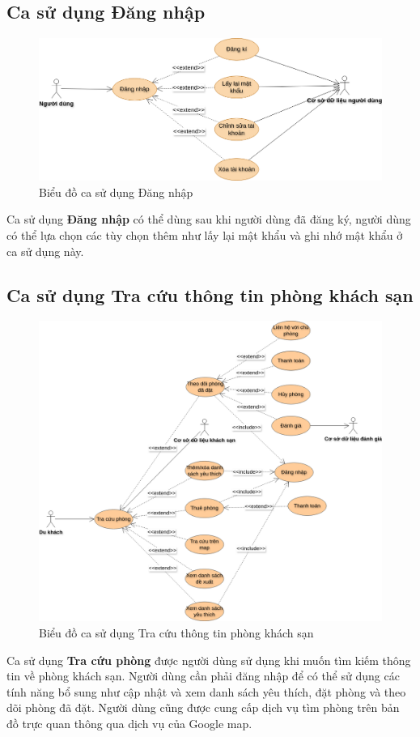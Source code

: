 \subsection{Ca sử dụng Đăng nhập}
\begin{figure}[H]
    \centering
    \includegraphics[width=\textwidth]{img/Use_Case-Đăng nhập.drawio.png}
    \caption{Biểu đồ ca sử dụng Đăng nhập}
\end{figure}
Ca sử dụng \textbf{Đăng nhập} có thể dùng sau khi người dùng đã đăng ký, người dùng có thể lựa chọn các tùy chọn thêm như lấy lại mật khẩu và ghi nhớ mật khẩu ở ca sử dụng này.

\subsection{Ca sử dụng Tra cứu thông tin phòng khách sạn}
\begin{figure}[H]
    \centering
    \includegraphics[width=\textwidth]{img/Use_Case-Tra cứu phòng.drawio.png}
    \caption{Biểu đồ ca sử dụng Tra cứu thông tin phòng khách sạn
}
\end{figure}
Ca sử dụng \textbf{Tra cứu phòng} được người dùng sử dụng khi muốn tìm kiếm thông tin về phòng khách sạn. Người dùng cần phải đăng nhập để có thể sử dụng các tính năng bổ sung như cập nhật và xem danh sách yêu thích, đặt phòng và theo dõi phòng đã đặt. Người dùng cũng được cung cấp dịch vụ tìm phòng trên bản đồ trực quan thông qua dịch vụ của Google map.

